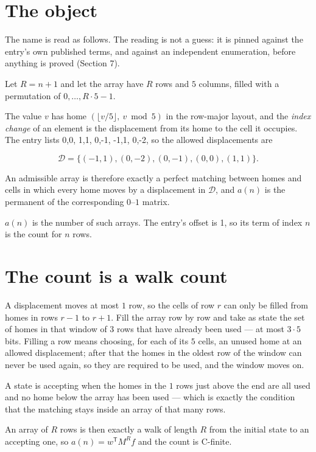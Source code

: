 \documentclass[11pt]{article}
\theoremstyle{definition}
\begin{document}
\section{The object}

The name is read as follows. The reading is not a guess: it is pinned against the entry's own published terms, and against an independent enumeration, before anything is proved (Section 7).

Let $R = n + 1$ and let the array have $R$ rows and $5$ columns, filled with a permutation of $0,\dots,R\cdot5-1$.

The value $v$ has home $(\lfloor v/5\rfloor,\ v \bmod 5)$ in the row-major layout, and the {\itshape index change} of an element is the displacement from its home to the cell it occupies. The entry lists 0,0, 1,1, 0,-1, -1,1, 0,-2, so the allowed displacements are

\[\mathcal{D} = \{(-1,1), (0,-2), (0,-1), (0,0), (1,1)\}.\]

An admissible array is therefore exactly a perfect matching between homes and cells in which every home moves by a displacement in $\mathcal{D}$, and $a(n)$ is the permanent of the corresponding $0$--$1$ matrix.

$a(n)$ is the number of such arrays. The entry's offset is 1, so its term of index $n$ is the count for $n$ rows.

\section{The count is a walk count}

A displacement moves at most $1$ row, so the cells of row $r$ can only be filled from homes in rows $r-1$ to $r+1$. Fill the array row by row and take as state the set of homes in that window of $3$ rows that have already been used --- at most $3\cdot5$ bits. Filling a row means choosing, for each of its $5$ cells, an unused home at an allowed displacement; after that the homes in the oldest row of the window can never be used again, so they are required to be used, and the window moves on.

A state is accepting when the homes in the $1$ rows just above the end are all used and no home below the array has been used --- which is exactly the condition that the matching stays inside an array of that many rows.

An array of $R$ rows is then exactly a walk of length $R$ from the initial state to an accepting one, so $a(n) = w^{\mathsf T}M^{R}f$ and the count is C-finite.
\end{document}
